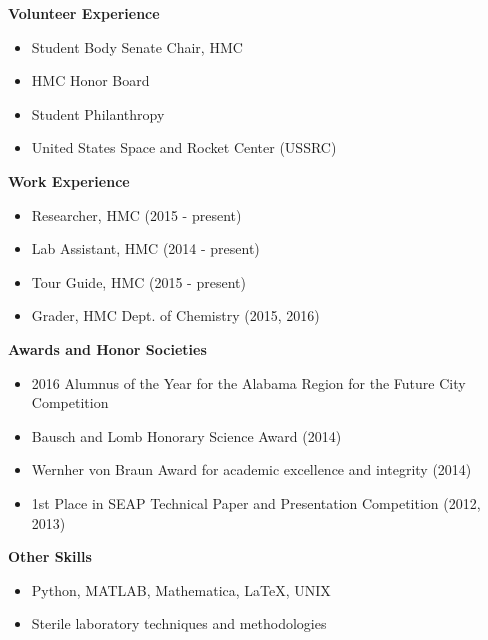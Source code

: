 \documentclass[9pt]{article}
\begin{document}
\begin{multicols*}{2}

\noindent
{\bf Volunteer Experience \\}
\vspace{-8mm}
	\begin{itemize}[leftmargin=3.75mm]
		\setlength{\itemsep}{0pt}
    	\setlength{\parskip}{0pt}
    	\setlength{\parsep}{0pt}
		\item Student Body Senate Chair, HMC
		\item HMC Honor Board
		\item Student Philanthropy
		\item United States Space and Rocket Center (USSRC)
	\end{itemize}

\noindent
{\bf Work Experience \\}
\vspace{-8mm}
	\begin{itemize}[leftmargin=3.75mm]
		\setlength{\itemsep}{0pt}
    	\setlength{\parskip}{0pt}
    	\setlength{\parsep}{0pt}
		\item Researcher, HMC (2015 - present)
		\item Lab Assistant, HMC (2014 - present)
		\item Tour Guide, HMC (2015 - present)
		\item Grader, HMC Dept. of Chemistry (2015, 2016)
	\end{itemize}

\hfill	
\columnbreak

\noindent

{\bf Awards and Honor Societies \\}
\vspace{-8mm}
	\begin{itemize}[leftmargin=3.75mm]
		\setlength{\itemsep}{0pt}
    	\setlength{\parskip}{0pt}
    	\setlength{\parsep}{0pt}
		\item 2016 Alumnus of the Year for the Alabama Region for the 			Future City Competition
		\item Bausch and Lomb Honorary Science Award (2014)
		\item Wernher von Braun Award for academic excellence and 				integrity (2014)
		\item 1st Place in SEAP Technical Paper and Presentation 				Competition (2012, 2013)
	\end{itemize}

\noindent
{\bf Other Skills \\}
\vspace{-8mm}
	\begin{itemize}[leftmargin=3.75mm]
		\setlength{\itemsep}{0pt}
    	\setlength{\parskip}{0pt}
    	\setlength{\parsep}{0pt}
		\item Python, MATLAB, Mathematica, \LaTeX, UNIX
		\item Sterile laboratory techniques and methodologies
	\end{itemize}

\end{multicols*}
%
%
\end{document}
